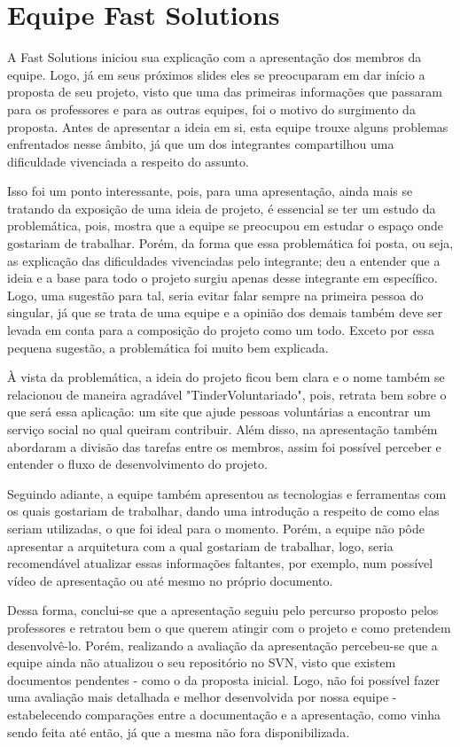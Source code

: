 \section{Equipe Fast Solutions}
A Fast Solutions iniciou sua explicação com a apresentação dos membros da equipe. Logo, já em seus próximos slides eles se preocuparam em dar início a proposta de seu projeto, visto que uma das primeiras informações que passaram para os professores e para as outras equipes, foi o motivo do surgimento da proposta.
Antes de apresentar a ideia em si, esta equipe trouxe alguns problemas enfrentados nesse âmbito, já que um dos integrantes compartilhou uma dificuldade vivenciada a respeito do assunto.

Isso foi um ponto interessante, pois, para uma apresentação, ainda mais se tratando da exposição de uma ideia de projeto, é essencial se ter um estudo da problemática, pois, mostra que a equipe se preocupou em estudar o espaço onde gostariam de trabalhar. Porém, da forma que essa problemática foi posta, ou seja, as explicação das dificuldades vivenciadas pelo integrante; deu a entender que a ideia e a base para todo o projeto surgiu apenas desse integrante em específico. Logo, uma sugestão para tal, seria evitar falar sempre na primeira pessoa do singular, já que se trata de uma equipe e a opinião dos demais também deve ser levada em conta para a composição do projeto como um todo. Exceto por essa pequena sugestão, a problemática foi muito bem explicada.

À vista da problemática, a ideia do projeto ficou bem clara e o nome também se relacionou de maneira agradável "TinderVoluntariado", pois, retrata bem sobre o que será essa aplicação: um site que ajude pessoas voluntárias a encontrar um serviço social no qual queiram contribuir. Além disso, na apresentação também abordaram a divisão das tarefas entre os membros, assim foi possível perceber e entender o fluxo de desenvolvimento do projeto.

Seguindo adiante, a equipe também apresentou as tecnologias e ferramentas com os quais gostariam de trabalhar, dando uma introdução a respeito de como elas seriam utilizadas, o que foi ideal para o momento. Porém, a equipe não pôde apresentar a arquitetura com a qual gostariam de trabalhar, logo, seria recomendável atualizar essas informações faltantes, por exemplo, num possível vídeo de apresentação ou até mesmo no próprio documento.

Dessa forma, conclui-se que a apresentação seguiu pelo percurso proposto pelos professores e retratou bem o que querem atingir com o projeto e como pretendem desenvolvê-lo. Porém, realizando a avaliação da apresentação percebeu-se que a equipe ainda não atualizou o seu repositório no SVN, visto que existem documentos pendentes - como o da proposta inicial. Logo, não foi possível fazer uma avaliação mais detalhada e melhor desenvolvida por nossa equipe - estabelecendo comparações entre a documentação e a apresentação, como vinha sendo feita até então, já que a mesma não fora disponibilizada. 

